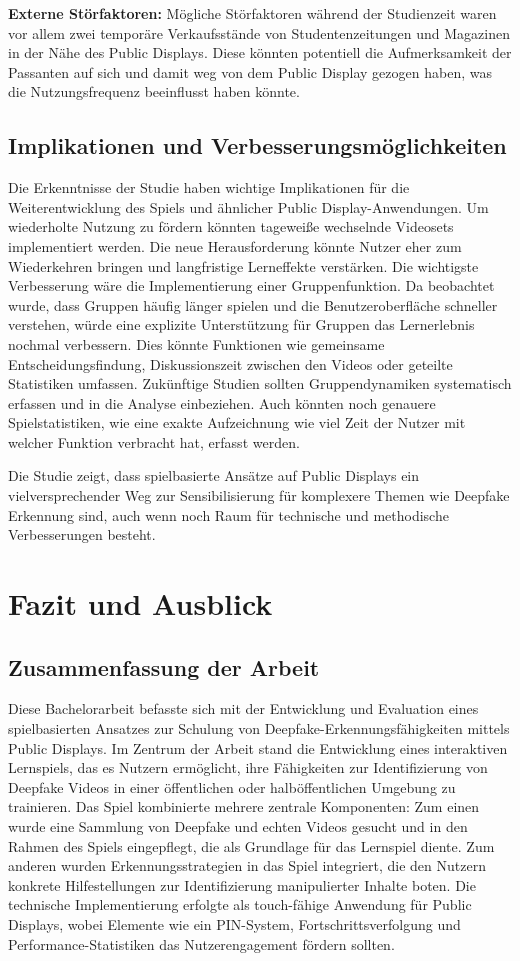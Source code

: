 \textbf{Externe Störfaktoren:}
Mögliche Störfaktoren während der Studienzeit waren vor allem zwei temporäre Verkaufsstände von Studentenzeitungen und Magazinen in der Nähe des Public Displays. 
Diese könnten potentiell die Aufmerksamkeit der Passanten auf sich und damit weg von dem Public Display gezogen haben, was die Nutzungsfrequenz beeinflusst haben könnte.

\section{Implikationen und Verbesserungsmöglichkeiten}
Die Erkenntnisse der Studie haben wichtige Implikationen für die Weiterentwicklung des Spiels und ähnlicher Public Display-Anwendungen. 
Um wiederholte Nutzung zu fördern könnten tageweiße wechselnde Videosets implementiert werden. 
Die neue Herausforderung könnte Nutzer eher zum Wiederkehren bringen und langfristige Lerneffekte verstärken.
Die wichtigste Verbesserung wäre die Implementierung einer Gruppenfunktion. 
Da beobachtet wurde, dass Gruppen häufig länger spielen und die Benutzeroberfläche schneller verstehen, 
würde eine explizite Unterstützung für Gruppen das Lernerlebnis nochmal verbessern. 
Dies könnte Funktionen wie gemeinsame Entscheidungsfindung, Diskussionszeit zwischen den Videos oder geteilte Statistiken umfassen.
Zukünftige Studien sollten Gruppendynamiken systematisch erfassen und in die Analyse einbeziehen. 
Auch könnten noch genauere Spielstatistiken, wie eine exakte Aufzeichnung wie viel Zeit der Nutzer mit welcher Funktion verbracht hat, erfasst werden.

Die Studie zeigt, dass spielbasierte Ansätze auf Public Displays ein vielversprechender Weg zur Sensibilisierung für komplexere Themen wie Deepfake Erkennung sind, 
auch wenn noch Raum für technische und methodische Verbesserungen besteht.
\chapter{Fazit und Ausblick}
\section{Zusammenfassung der Arbeit}
Diese Bachelorarbeit befasste sich mit der Entwicklung und Evaluation eines spielbasierten Ansatzes zur Schulung von Deepfake-Erkennungsfähigkeiten 
mittels Public Displays. 
Im Zentrum der Arbeit stand die Entwicklung eines interaktiven Lernspiels, das es Nutzern ermöglicht, 
ihre Fähigkeiten zur Identifizierung von Deepfake Videos in einer öffentlichen oder halböffentlichen Umgebung zu trainieren.
Das Spiel kombinierte mehrere zentrale Komponenten: 
Zum einen wurde eine Sammlung von Deepfake und echten Videos gesucht und in den Rahmen des Spiels eingepflegt, die als Grundlage für das Lernspiel diente. 
Zum anderen wurden Erkennungsstrategien in das Spiel integriert, die den Nutzern konkrete Hilfestellungen zur Identifizierung manipulierter Inhalte boten. 
Die technische Implementierung erfolgte als touch-fähige Anwendung für Public Displays, 
wobei Elemente wie ein PIN-System, Fortschrittsverfolgung und Performance-Statistiken das Nutzerengagement fördern sollten. 

